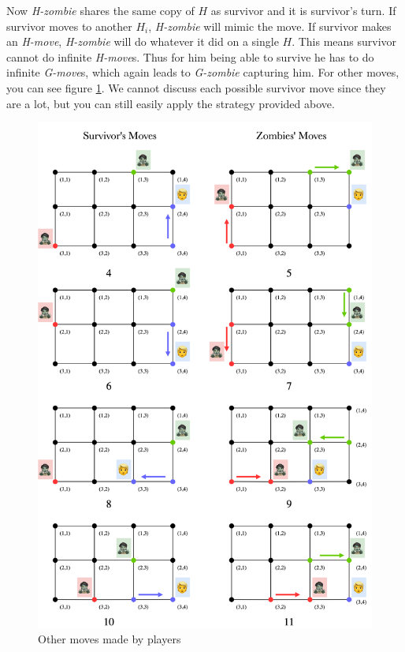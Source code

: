 \documentclass[1p]{elsarticle}
\begin{document}
Now {\it H-zombie} shares the same copy of $H$ as survivor and it is survivor's turn. If survivor moves to another $H_i$,
{\it H-zombie} will mimic the move. If survivor makes an {\it H-move}, {\it H-zombie} will do whatever it did on a
single $H$. This means survivor cannot do infinite {\it H-move}s. Thus for him being able to survive he has to do
infinite {\it G-move}s, which again leads to {\it G-zombie} capturing him. For other moves, you can see
figure \ref{fig:p6}. We cannot discuss each possible survivor move since they are a lot, but you can still easily apply
the strategy provided above. 

\begin{figure}[h!]
	\centering
	\includegraphics[width=1\linewidth]{fig/p34m6.png}
	\caption{Other moves made by players}
	\label{fig:p6}
\end{figure}

	
\end{document}
